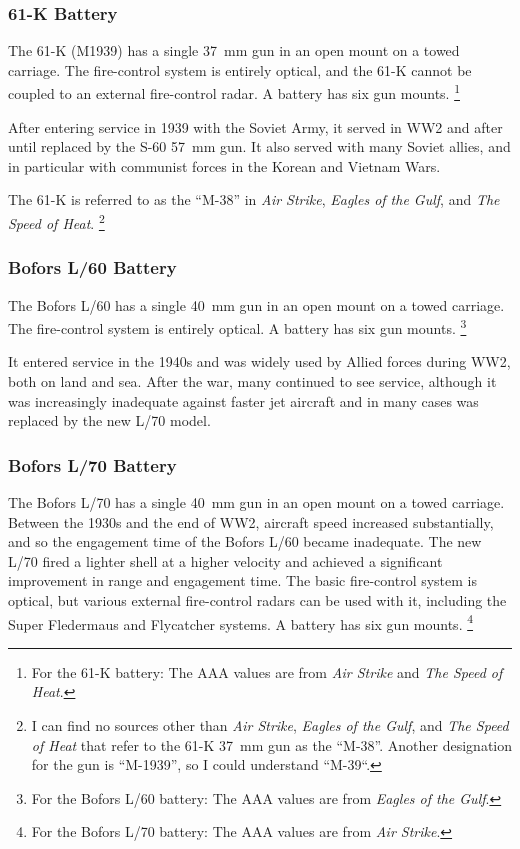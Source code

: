 \documentclass[10pt]{article}
\newcommand{\note}[1]{%
    \footnote{%
        \setlength{\parindent}{0pt}%
        \setlength{\parskip}{\smallskipamount}%
        #1
    }%
}
\begin{document}
\subsubsection{61-K Battery}

The 61-K (M1939) has a single 37~mm gun in an open mount on a towed carriage. The fire-control system is entirely optical, and the 61-K cannot be coupled to an external fire-control radar. A battery has six gun mounts.%
\note{
    For the 61-K battery: The AAA values are from \emph{Air Strike} and \emph{The Speed of Heat}.
}

After entering service in 1939 with the Soviet Army, it served in WW2 and after until replaced by the S-60 57~mm gun. It also served with many Soviet allies, and in particular with communist forces in the Korean and Vietnam Wars.

The 61-K is referred to as the “M-38” in \emph{Air Strike}, \emph{Eagles of the Gulf}, and \emph{The Speed of Heat}.%
\note{
    I can find no sources other than \emph{Air Strike}, \emph{Eagles of the Gulf}, and \emph{The Speed of Heat} that refer to the 61-K 37~mm gun as the “M-38”. Another designation for the gun is “M-1939”, so I could understand “M-39“.
}

\subsubsection{Bofors L/60 Battery}

The Bofors L/60 has a single 40~mm gun in an open mount on a towed carriage. The fire-control system is entirely optical. A battery has six gun mounts.%
\note{
    For the Bofors L/60 battery: The AAA values are from \emph{Eagles of the Gulf}.
}

It entered service in the 1940s and was widely used by Allied forces during WW2, both on land and sea. After the war, many continued to see service, although it was increasingly inadequate against faster jet aircraft and in many cases was replaced by the new L/70 model.

\subsubsection{Bofors L/70 Battery}

The Bofors L/70 has a single 40~mm gun in an open mount on a towed carriage. Between the 1930s and the end of WW2, aircraft speed increased substantially, and so the engagement time of the Bofors L/60 became inadequate. The new L/70 fired a lighter shell at a higher velocity and achieved a significant improvement in range and engagement time. The basic fire-control system is optical, but various external fire-control radars can be used with it, including the Super Fledermaus and Flycatcher systems. A battery has six gun mounts.%
\note{
    For the Bofors L/70 battery: The AAA values are from \emph{Air Strike}.
}
\end{document}
